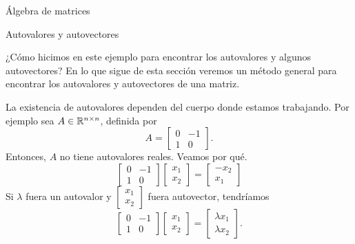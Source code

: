 \begin{chapter}{\'Algebra de matrices}
\begin{section}{Autovalores y autovectores}
\begin{ejemplo}
            ¿Cómo hicimos en este ejemplo para encontrar los autovalores y algunos autovectores?  En lo que sigue de esta sección veremos un método general para encontrar los autovalores y autovectores de una matriz.
        \end{ejemplo}

        \begin{observacion*}
        La existencia de autovalores dependen del cuerpo donde estamos trabajando. 
        Por ejemplo sea $A \in \mathbb R^{n\times n}$,  definida por 
        $$A=
        \begin{bmatrix}
            0&-1\\1&0
        \end{bmatrix}
        .$$ 
        Entonces,  $A$ no tiene autovalores reales. Veamos por qué.
        \begin{equation}\label{eq-no-aut-1}
            \begin{bmatrix}
                0&-1\\1&0
            \end{bmatrix}
            \begin{bmatrix}
                x_1\\x_2
            \end{bmatrix} =
            \begin{bmatrix}
                -x_2\\x_1
            \end{bmatrix}
        \end{equation}
        Si $\lambda$ fuera un autovalor y $\begin{bmatrix}x_1\\x_2\end{bmatrix}$ fuera autovector, tendríamos
        \begin{equation}\label{eq-no-aut-2}
            \begin{bmatrix}
                0&-1\\1&0
            \end{bmatrix}
            \begin{bmatrix}
                x_1\\x_2
            \end{bmatrix} =
            \begin{bmatrix}
                \lambda x_1\\\lambda x_2
            \end{bmatrix}.
        \end{equation}

\end{observacion*}
\end{section}
\end{chapter}
